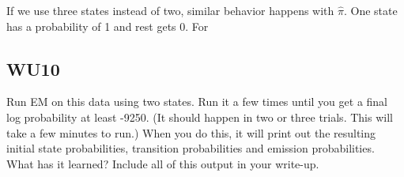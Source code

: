 \documentclass[a4paper,11pt]{article}
\begin{document}
If we use three states instead of two, similar behavior happens with
$\hat \pi$. One state has a probability of 1 and rest gets 0. For 

\subsection{WU10}
\textsf{Run EM on this data using two states. 
Run it a few times until you get a final log probability at least -9250. 
(It should happen in two or three trials. This will take a few minutes to run.) 
When you do this, it will print out the resulting initial state probabilities, 
transition probabilities and emission probabilities. 
What has it learned? Include all of this output in your write-up.}\vspace{0.1in}
\end{document}
